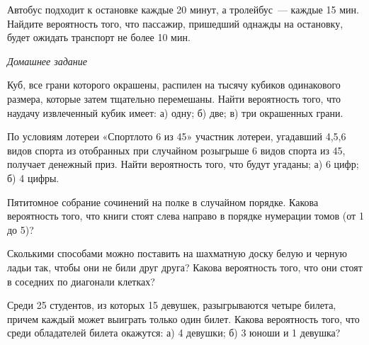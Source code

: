 \documentclass[a4paper,14pt]{extarticle}
\begin{document}
\begin{enumerate}
\item Автобус подходит к остановке каждые 20 минут, а тролейбус~--- каждые 15 мин. Найдите вероятность того, что пассажир, пришедший однажды на остановку, будет ожидать транспорт не более 10 мин.

\pagebreak
{\item[]\centering \itshape Домашнее задание\par}
\item 
Куб, все грани которого окрашены, распилен на тысячу кубиков
одинакового размера, которые затем тщательно перемешаны. Найти
вероятность того, что наудачу извлеченный кубик имеет: а) одну; б) две;
в) три окрашенных грани.

\item 
По условиям лотереи «Спортлото 6 из 45» участник лотереи, угадавший
4,5,6 видов спорта из отобранных при случайном розыгрыше 6 видов спорта
из 45, получает денежный приз. Найти вероятность того, что будут
угаданы; а) 6 цифр; б) 4 цифры.



 \item 
 Пятитомное собрание сочинений на полке в случайном порядке. Какова
 вероятность того, что книги стоят слева направо в порядке нумерации
 томов (от 1 до 5)?


\item 
Сколькими способами можно поставить на шахматную доску белую и черную ладьи так, чтобы они не били друг друга? Какова вероятность того, что они стоят в соседних по диагонали клетках?

\item 
Среди 25 студентов, из которых 15 девушек, разыгрываются четыре
билета, причем каждый может выиграть только один билет. Какова
вероятность того, что среди обладателей билета окажутся: а) 4 девушки;
б) 3 юноши и 1 девушка?




\end{enumerate}
\end{document}
